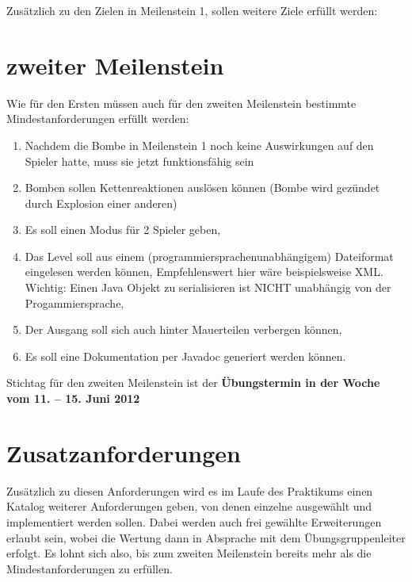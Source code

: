 \documentclass{programmierpraktikum}
\subtitle{Bomberman}
\begin{document}
\maketitle
Zusätzlich zu den Zielen in Meilenstein 1, sollen weitere Ziele erfüllt werden:
%
\section{zweiter Meilenstein}
Wie für den Ersten müssen auch für den zweiten Meilenstein bestimmte Mindestanforderungen erfüllt werden:
\begin{enumerate}
  \item Nachdem die Bombe in Meilenstein 1 noch keine Auswirkungen auf den Spieler hatte, muss sie jetzt funktionsfähig sein
  \item Bomben sollen Kettenreaktionen auslösen können (Bombe wird gezündet durch Explosion einer anderen)
  \item Es soll einen Modus für 2 Spieler geben,
  \item Das Level soll aus einem (programmiersprachenunabhängigem) Dateiformat eingelesen werden können, Empfehlenswert hier wäre beispielsweise XML. Wichtig: Einen Java Objekt zu serialisieren ist NICHT unabhängig von der Progammiersprache,
  \item Der Ausgang soll sich auch hinter Mauerteilen verbergen können,
  \item Es soll eine Dokumentation per Javadoc generiert werden können.
\end{enumerate}
Stichtag für den zweiten Meilenstein ist der \textbf{Übungstermin in der Woche vom 11. -- 15. Juni 2012}
\section{Zusatzanforderungen}
Zusätzlich zu diesen Anforderungen wird es im Laufe des Praktikums einen Katalog weiterer Anforderungen geben, von denen einzelne ausgewählt und implementiert werden sollen. Dabei werden auch frei gewählte Erweiterungen erlaubt sein, wobei die Wertung dann in Absprache mit dem Übungsgruppenleiter erfolgt. Es lohnt sich also, bis zum zweiten Meilenstein bereits mehr als die Mindestanforderungen zu erfüllen.
\end{document}
